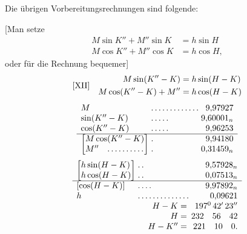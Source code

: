 Die übrigen Vorbereitungsrechnungen sind folgende:

[Man setze
\[
\begin{aligned}
M\sin K''+M''\sin K&=h\sin H\\
M\cos K''+M''\cos K&=h\cos H,
\end{aligned}
\]
oder für die Rechnung bequemer]
\[
\begin{array}{l@{\quad}l}
[\mathrm{XII}]&\begin{aligned}
M\sin(K''-K)&=h\sin(H-K)\\
M\cos(K''-K)+M''&=h\cos(H-K)
\end{aligned}
\end{array}
\]
\[
\begin{array}{l@{\;}l@{\;}r}
M&\mathord{.}\,\mathord{.}\,\mathord{.}\,\mathord{.}\,\mathord{.}\,\mathord{.}\,\mathord{.}\,\mathord{.}\,\mathord{.}\,\mathord{.}\,\mathord{.}\,\mathord{.}\,\mathord{.}&9{,}97927\\
\sin(K''-K)&\mathord{.}\,\mathord{.}\,\mathord{.}\,\mathord{.}\,\mathord{.}&9{,}60001_n\\
\cos(K''-K)&\mathord{.}\,\mathord{.}\,\mathord{.}\,\mathord{.}\,\mathord{.}&9{,}96253\\\hline
\left[\begin{array}{@{}l@{}}M\cos(K''-K)\\M''\quad\mathord{.}\,\mathord{.}\,\mathord{.}\,\mathord{.}\,\mathord{.}\,\mathord{.}\,\mathord{.}\,\mathord{.}\,\mathord{.}\,\mathord{.}\end{array}\right]&
\begin{array}{@{}l@{}}\mathord{.}\\\mathord{.}\end{array}&
\begin{array}{@{}r@{}}9{,}94180\\0{,}31459_n\end{array}
\end{array}
\]
\[
\begin{array}{l@{\;}l@{\;}r}
\left[\begin{array}{@{}l@{}}h\sin(H-K)\\h\cos(H-K)\end{array}\right]&
\begin{array}{@{}l@{}}\mathord{.}\,\mathord{.}\\\mathord{.}\,\mathord{.}\end{array}&
\begin{array}{@{}r@{}}9{,}57928_n\\0{,}07513_n\end{array}\\\hline
[\cos(H-K)]&\mathord{.}\,\mathord{.}\,\mathord{.}\,\mathord{.}&9{,}97892_n\\
h&\mathord{.}\,\mathord{.}\,\mathord{.}\,\mathord{.}\,\mathord{.}\,\mathord{.}\,\mathord{.}\,\mathord{.}\,\mathord{.}\,\mathord{.}\,\mathord{.}\,\mathord{.}\,\mathord{.}\,\mathord{.}&0{,}09621\\
\multicolumn{2}{r}{H-K=}&197^{0}\,42'\,23''\\
\multicolumn{2}{r}{H=}&232\quad56\quad42\\
\multicolumn{2}{r}{H-K''=}&221\quad10\quad0.
\end{array}
\]

